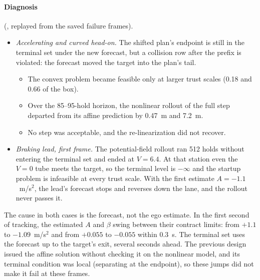 \documentclass[11pt]{article}
\begin{document}
\paragraph{Diagnosis} (, replayed from the
saved failure frames).
\begin{itemize}
\item \emph{Accelerating and curved head-on.} The shifted plan's endpoint is
  still in the terminal set under the new forecast, but a collision row after
  the prefix is violated: the forecast moved the target into the plan's tail.
  \begin{itemize}
  \item The convex problem became feasible only at larger trust scales (0.18
    and 0.66 of the box).
  \item Over the 85--95-hold horizon, the nonlinear rollout of the full step
    departed from its affine prediction by 0.47~m and 7.2~m.
  \item No step was acceptable, and the re-linearization did not recover.
  \end{itemize}
\item \emph{Braking lead, first frame.} The potential-field rollout ran
  512 holds without entering the terminal set and ended at $V=6.4$. At that
  station even the $V=0$ tube meets the target, so the terminal level is
  $-\infty$ and the startup problem is infeasible at every trust scale. With
  the first estimate $A=-1.1$~m/s$^2$, the lead's forecast stops and reverses
  down the lane, and the rollout never passes it.
\end{itemize}
The cause in both cases is the forecast, not the ego estimate. In the first
second of tracking, the estimated $A$ and $\beta$ swing between their
contract limits: from $+1.1$ to $-1.09$~m/s$^2$ and from $+0.055$ to
$-0.055$ within 0.3~s. The terminal set uses the forecast up to the target's
exit, several seconds ahead. The previous design issued the affine solution
without checking it on the nonlinear model, and its terminal condition was
local (separating at the endpoint), so these jumps did not make it fail at
these frames.
\end{document}
